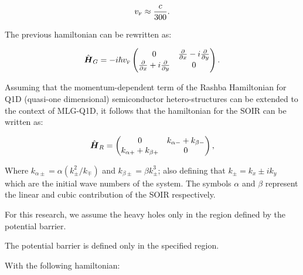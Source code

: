 \begin{equation}
    \label{eq:vF}
    v_{\mbox{\tiny F}} \approx \frac{c}{300}.
\end{equation}

The previous hamiltonian can be rewritten as:

\begin{equation}
    \label{eq:pristineGrapheneMatrix}
    \hat{\mbox{\boldmath $H$}}_G = -i\hbar v_{\mbox{\tiny F}}
    \begin{pmatrix}
        0                                                         & \frac{\partial}{\partial x}- i\frac{\partial}{\partial y} \\
        \frac{\partial}{\partial x}+ i\frac{\partial}{\partial y} & 0
    \end{pmatrix}.
\end{equation}

Assuming that the momentum-dependent term of the Rashba Hamiltonian for Q1D (quasi-one dimensional) semiconductor hetero-structures can be extended to the context of MLG-Q1D\cite{RDiago2010, Serna2019, RCDiagoEPL2015}, it follows that the hamiltonian for the SOIR can be written as:

\begin{equation}
    \label{eq:SOIRHamiltonian}
    \hat{\mbox{\boldmath $H$}}_R =
    \begin{pmatrix}
        0                        & k_{\alpha-} + k_{\beta-} \\
        k_{\alpha+} + k_{\beta+} & 0
    \end{pmatrix},
\end{equation}

\noindent Where $k_{\alpha\pm} = \alpha\left(k_{\pm}^2/k_{\mp}\right)$ and $k_{\beta\pm} = \beta k_{\pm}^3$; also defining that $k_{\pm}=k_x\pm i k_y$ which are the initial wave numbers of the system.
The symbols $\alpha$ and $\beta$ represent the linear and cubic contribution of the SOIR respectively.

For this research, we assume the heavy holes only in the region defined by the potential barrier.

The potential barrier is defined only in the specified region.


With the following hamiltonian:

